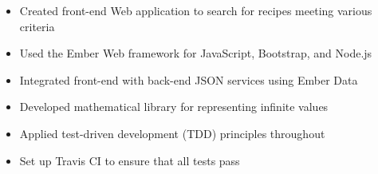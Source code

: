 \documentclass[10pt]{article}
\begin{document}

	\begin{itemize}[noitemsep,topsep=0.25em]
		\item Created front-end Web application to search for recipes meeting various criteria
		\item Used the Ember Web framework for JavaScript, Bootstrap, and Node.js
		\item Integrated front-end with back-end JSON services using Ember Data
	\end{itemize}


	\begin{itemize}[noitemsep,topsep=0.25em]
		\item Developed mathematical library for representing infinite values
		\item Applied test-driven development (TDD) principles throughout
		\item Set up Travis CI to ensure that all tests pass
	\end{itemize}
\end{document}
